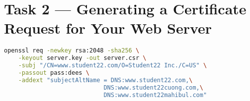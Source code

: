 \section{Task 2 --- Generating a Certificate Request for Your Web Server}
%
\begin{lstlisting}[language=bash,caption=A command generating CSR for the server]
openssl req -newkey rsa:2048 -sha256 \
    -keyout server.key -out server.csr \
    -subj "/CN=www.student22.com/O=Student22 Inc./C=US" \
    -passout pass:dees \
    -addext "subjectAltName = DNS:www.student22.com,\
                            DNS:www.student22cuong.com,\
                            DNS:www.student22mahibul.com"
\end{lstlisting}